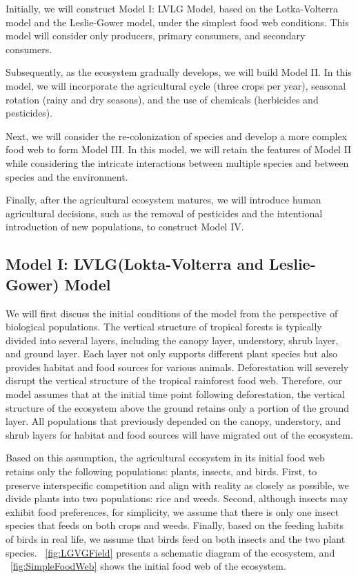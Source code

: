 \documentclass{HZNUMCM}
\begin{document}
        Initially, we will construct Model I: LVLG Model, based on the Lotka-Volterra model and the Leslie-Gower model, 
        under the simplest food web conditions. This model will consider only producers, primary consumers, and secondary consumers.

        Subsequently, as the ecosystem gradually develops, we will build Model II. 
        In this model, we will incorporate the agricultural cycle (three crops per year), 
        seasonal rotation (rainy and dry seasons), and the use of chemicals (herbicides and pesticides).
        
        Next, we will consider the re-colonization of species and develop a more complex food web to form Model III. 
        In this model, we will retain the features of Model II while considering the intricate interactions between multiple species and between species and the environment.

        Finally, after the agricultural ecosystem matures, we will introduce human agricultural decisions, 
        such as the removal of pesticides and the intentional introduction of new populations, to construct Model IV.
    
    \subsection{Model I: LVLG(Lokta-Volterra and Leslie-Gower) Model}
      We will first discuss the initial conditions of the model from the perspective of biological populations. 
      The vertical structure of tropical forests is typically divided into several layers, including the canopy layer, understory, shrub layer, and ground layer. 
      Each layer not only supports different plant species but also provides habitat and food sources for various animals. 
      Deforestation will severely disrupt the vertical structure of the tropical rainforest food web. 
      Therefore, our model assumes that at the initial time point following deforestation, 
      the vertical structure of the ecosystem above the ground retains only a portion of the ground layer. 
      All populations that previously depended on the canopy, understory, and shrub layers for habitat and food sources will have migrated out of the ecosystem.

      Based on this assumption, the agricultural ecosystem in its initial food web retains only the following populations: plants, insects, and birds. 
      First, to preserve interspecific competition and align with reality as closely as possible, we divide plants into two populations: rice and weeds. 
      Second, although insects may exhibit food preferences, for simplicity, we assume that there is only one insect species that feeds on both crops and weeds. 
      Finally, based on the feeding habits of birds in real life, we assume that birds feed on both insects and the two plant species. 
      \figurename~\ref{fig:LGVGField} presents a schematic diagram of the ecosystem, and \figurename~\ref{fig:SimpleFoodWeb} shows the initial food web of the ecosystem.
\end{document}
